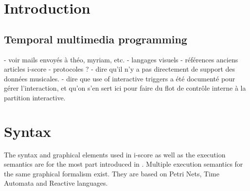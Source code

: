 \documentclass{article}
\title{\papertitle}
\begin{document}
%
\capstartfalse
\maketitle
\capstarttrue
%
\begin{abstract}
     The development and authoring of interactive music or applications, such as user interfaces for arts \& exhibitions
     has traditionally been done with tools that pertain to two broad metaphors. 
     Cue-based environments work by making groups of parameters and sending them to remote devices, 
     while more interactive applications are generally written in generic art-oriented 
     programming environments, such as Max/MSP, Processing or OpenFrameworks.
     In this paper, we argue about the specific issues that arise in such environments, and we present 
     the current version of the i-score sequencer. It is an extensive software suite that bridges
     the gap between time-based, logic-based and flow-based interactive application authoring tools. 
     This is done in a single cohesive graphical user interface, built upon a few simple and novel primitives that give to the composer the expressive power of structured programming, in a time line adapted to the notation of parameter-oriented interactive music.    
\end{abstract}
%

\section{Introduction}\label{sec:introduction}

\subsection{Temporal multimedia programming}\label{sec:page_size}
\cite{ackermann1994direct}\cite{song1999interactive}
- voir mails envoyés à théo, myriam, etc.
- langages visuels
- références anciens articles i-score 
- protocoles ?
- dire qu'il n'y a pas directement de support des données musicales.
- dire que use of interactive triggers a été documenté pour gérer l'interaction, 
et qu'on s'en sert ici pour faire du flot de contrôle interne à la partition interactive.
\section{Syntax}
The syntax and graphical elements used in i-score as well as the 
execution semantics are for the most part introduced in \cite{celerier2015ossia, baltazar2014score}.
Multiple execution semantics for the same graphical formalism exist. 
They are based on Petri Nets, Time Automata and Reactive languages.
\end{document}
